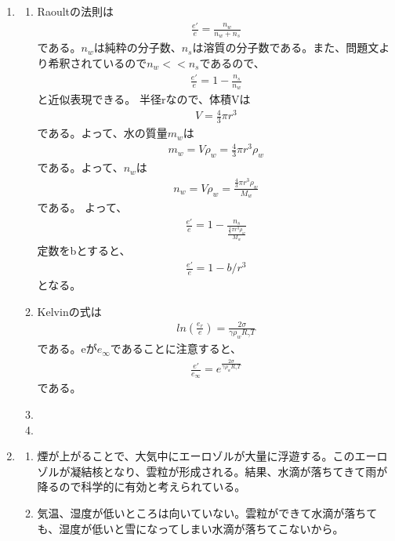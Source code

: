\documentclass{jsarticle}
\newenvironment{problems}
{
  \renewcommand\labelenumi{\doublebox{\arabic{enumi}}}
  \begin{enumerate}
}{
  \end{enumerate}
  \renewcommand\labelenumi{\arabic{enumi}.}
}
\begin{document}
\begin{problems}
\begin{enumerate}[(1)]
\item 水の融点は0℃なので、低いと雪になりやすい。また、湿度が低いと蒸発したときの水によって周囲の空気が冷やされる。そのため、雪が溶けることなく地表に到達できるため、気温や湿度が低いほうが良い。
\end{enumerate}
\item
\begin{enumerate}[(1)]
	\item
	Raoultの法則は
		\begin{align*}
			\frac{e'}{e} = \frac{n_w}{n_w+n_s}
		\end{align*}
	である。$n_w$は純粋の分子数、$n_s$は溶質の分子数である。また、問題文より希釈されているので$n_w << n_s$であるので、
		\begin{align*}
			\frac{e'}{e} = 1 -\frac{n_s}{n_w}
		\end{align*}
と近似表現できる。
	半径rなので、体積Vは
		\begin{align*}
			V = \frac{4}{3}\pi r^3
		\end{align*}
	である。よって、水の質量$m_w$は
		\begin{align*}
			m_w = V\rho_w = \frac{4}{3}\pi r^3 \rho_w
		\end{align*}
	である。よって、$n_w$は
		\begin{align*}
			n_w = V\rho_w = \frac{\frac{4}{3}\pi r^3 \rho_w}{M_w}
		\end{align*}
		である。
		よって、
		\begin{align*}
			\frac{e'}{e} = 1-\frac{n_s}{\frac{\frac{4}{3}\pi r^3 \rho_w}{M_w}}
		\end{align*}
		定数をbとすると、
		\begin{align*}
			\frac{e'}{e} = 1 - b/r^3
		\end{align*}
	となる。
\item 
	Kelvinの式は
		\begin{align*}
			ln\left(\frac{e_r}{e}\right) = \frac{2\sigma}{\gamma\rho_w R_{\gamma}T}
	\end{align*}
	である。eが$e_\infty$であることに注意すると、
		\begin{align*}
			\frac{e'}{e_{\infty}} = e^{\frac{2\sigma}{\gamma\rho_w R_{\gamma}T}}
		\end{align*}
		である。
\item 

\item
\end{enumerate}
\item
	\begin{enumerate}[(1)]
		\item 煙が上がることで、大気中にエーロゾルが大量に浮遊する。このエーロゾルが凝結核となり、雲粒が形成される。結果、水滴が落ちてきて雨が降るので科学的に有効と考えられている。
		\item 気温、湿度が低いところは向いていない。雲粒ができて水滴が落ちても、湿度が低いと雪になってしまい水滴が落ちてこないから。
	\end{enumerate}
	
\end{problems}
\end{document}
